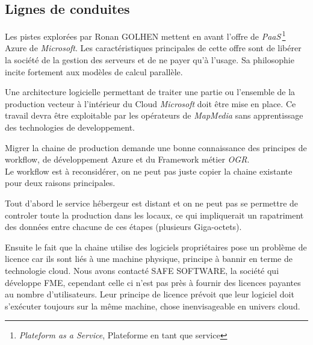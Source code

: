 %
%

\subsection{Lignes de conduites}

Les pistes explorées par Ronan GOLHEN mettent en avant l'offre de
\textit{PaaS}\,\footnote{\textit{Plateform as a Service}, Plateforme
  en tant que service} Azure de \textit{Microsoft}. Les
caractéristiques principales de cette offre sont de libérer la société
de la gestion des serveurs et de ne payer qu'à l'usage. Sa philosophie
incite fortement aux modèles de calcul parallèle.


Une architecture logicielle permettant de traiter une partie ou
l'ensemble de la production vecteur à l'intérieur du Cloud
\textit{Microsoft} doit être mise en place. Ce travail devra être
exploitable par les opérateurs de \textit{MapMedia} sans apprentissage
des technologies de developpement.


Migrer la chaine de production demande une bonne connaissance des
principes de workflow, de développement Azure et du Framework métier
\textit{OGR}.\\

 Le workflow est à reconsidérer, on ne peut pas juste copier la chaine
 existante pour deux raisons principales.

Tout d'abord le service hébergeur est distant et on ne peut pas se
permettre de controler toute la production dans les locaux, ce qui
impliquerait un rapatriment des données entre chacune de ces étapes
(plusieurs Giga-octets). 

Ensuite le fait que la chaine utilise des logiciels propriétaires pose
un problème de licence car ils sont liés à une machine physique,
principe à bannir en terme de technologie cloud.  Nous avons contacté
SAFE SOFTWARE, la société qui développe FME, cependant celle ci n'est
pas près à fournir des licences payantes au nombre
d'utilisateurs. Leur principe de licence prévoit que leur logiciel
doit s'exécuter toujours sur la même machine, chose inenvisageable en
univers cloud.\\


